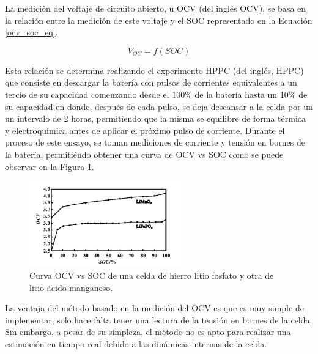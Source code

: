 \documentclass[10pt,a4paper]{article}
\newcounter{subsubsubsection}[subsubsection]
\begin{document}
\label{ocv_section}

\noindent La medici\'on del voltaje de circuito abierto, u \acrshort{OCV} (del
ingl\'es \acrlong{OCV}), se basa en la relaci\'on entre la medici\'on de este 
voltaje y el \acrshort{SOC} representado en la Ecuaci\'on \ref{ocv_soc_eq}.

\begin{equation}
    V_{OC} = f(SOC) \label{ocv_soc_eq}
\end{equation}

\noindent Esta relaci\'on se determina realizando el experimento \acrshort{HPPC} 
(del ingl\'es, \acrlong{HPPC}) que consiste en descargar la bater\'ia con pulsos 
de corrientes equivalentes a un tercio de su capacidad comenzando desde el 
100\% de la bater\'ia hasta un 10\% de su capacidad en donde, despu\'es de cada 
pulso, se deja descansar a la celda por un un intervalo de 2 horas, permitiendo 
que la misma se equilibre de forma t\'ermica y electroqu\'imica antes de aplicar 
el pr\'oximo pulso de corriente. Durante el proceso de este ensayo, se toman 
mediciones de corriente y tensi\'on en bornes de la bater\'ia, permiti\'endo 
obtener una curva de \acrshort{OCV} vs \acrshort{SOC} como se puede observar en 
la Figura \ref{soc_ocv_paper}.

\begin{figure}[h!]
    \begin{center}
        \includegraphics[width=0.6\textwidth]{soc_ocv_paper.png}
        \caption{Curva \acrshort{OCV} vs \acrshort{SOC} de una celda de hierro
        litio fosfato y otra de litio \'acido manganeso.}
        \label{soc_ocv_paper}
    \end{center}
\end{figure}

\noindent La ventaja del m\'etodo basado en la medici\'on del \acrshort{OCV} es
que es muy simple de implementar, solo hace falta tener una lectura de la
tensi\'on en bornes de la celda. Sin embargo, a pesar de su simpleza, el
m\'etodo no es apto para realizar una estimaci\'on en tiempo real debido a las
din\'amicas internas de la celda.
\end{document}
